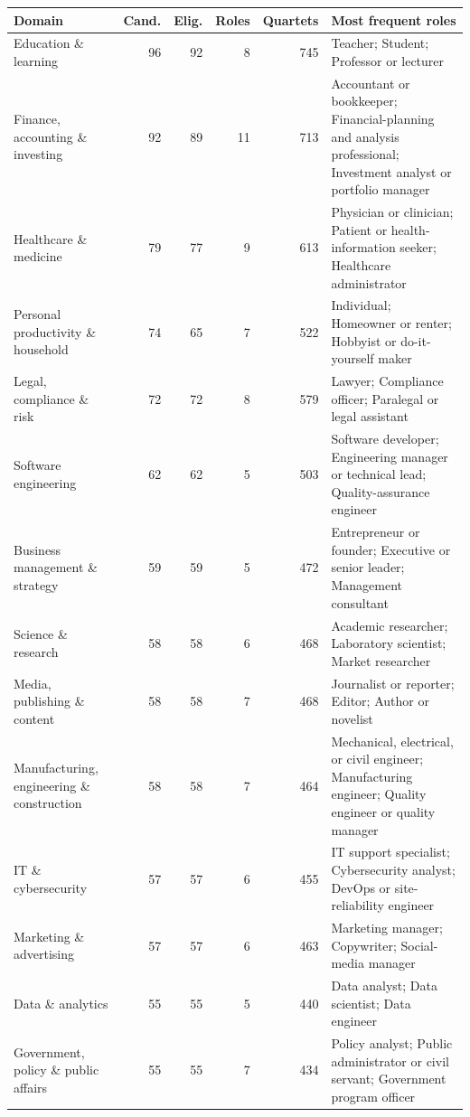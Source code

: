 \documentclass{article} %
\begin{document}
\begin{table}[p]
\centering\scriptsize
\setlength{\tabcolsep}{4pt}
\begin{tabular}{@{}p{3.9cm}rrrrp{6.0cm}@{}}
\toprule
Domain & Cand. & Elig. & Roles & Quartets & Most frequent roles \\
\midrule
Education \& learning & 96 & 92 & 8 & 745 & Teacher; Student; Professor or lecturer \\
Finance, accounting \& investing & 92 & 89 & 11 & 713 & Accountant or bookkeeper; Financial-planning and analysis professional; Investment analyst or portfolio manager \\
Healthcare \& medicine & 79 & 77 & 9 & 613 & Physician or clinician; Patient or health-information seeker; Healthcare administrator \\
Personal productivity \& household & 74 & 65 & 7 & 522 & Individual; Homeowner or renter; Hobbyist or do-it-yourself maker \\
Legal, compliance \& risk & 72 & 72 & 8 & 579 & Lawyer; Compliance officer; Paralegal or legal assistant \\
Software engineering & 62 & 62 & 5 & 503 & Software developer; Engineering manager or technical lead; Quality-assurance engineer \\
Business management \& strategy & 59 & 59 & 5 & 472 & Entrepreneur or founder; Executive or senior leader; Management consultant \\
Science \& research & 58 & 58 & 6 & 468 & Academic researcher; Laboratory scientist; Market researcher \\
Media, publishing \& content & 58 & 58 & 7 & 468 & Journalist or reporter; Editor; Author or novelist \\
Manufacturing, engineering \& construction & 58 & 58 & 7 & 464 & Mechanical, electrical, or civil engineer; Manufacturing engineer; Quality engineer or quality manager \\
IT \& cybersecurity & 57 & 57 & 6 & 455 & IT support specialist; Cybersecurity analyst; DevOps or site-reliability engineer \\
Marketing \& advertising & 57 & 57 & 6 & 463 & Marketing manager; Copywriter; Social-media manager \\
Data \& analytics & 55 & 55 & 5 & 440 & Data analyst; Data scientist; Data engineer \\
Government, policy \& public affairs & 55 & 55 & 7 & 434 & Policy analyst; Public administrator or civil servant; Government program officer \\

\end{tabular}
\end{table}
\end{document}
